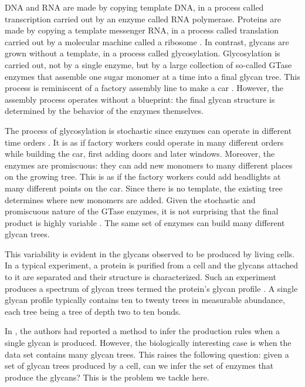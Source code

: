 
DNA and RNA are made by copying template DNA, in a process called transcription carried out by an enzyme called RNA polymerase. Proteins are made by copying a template messenger RNA, in a process called translation carried out by a molecular machine called a ribosome \cite{alberts2013essential}. In contrast, glycans are grown without a template, in a process called glycosylation. Glycosylation is carried out, not by a single enzyme, but by a large collection of so-called GTase enzymes that assemble one sugar monomer at a time into a final glycan tree. This process is reminiscent of a factory assembly line to make a car \cite{Jaiman2018}. However, the assembly process operates without a blueprint: the final glycan structure is determined by the behavior of the enzymes themselves.

The process of glycosylation is stochastic since enzymes can operate in different time orders \cite{Spahn2016}. It is as if factory workers could operate in many different orders while building the car, first adding doors and later windows. Moreover, the enzymes are promiscuous: they can add new monomers to many different places on the growing tree. This is as if the factory workers could add headlights at many different points on the car. Since there is no template, the existing tree determines where new monomers are added. Given the stochastic and promiscuous nature of the GTase enzymes, it is not surprising that the final product is highly variable \cite{Spahn2014}. The same set of enzymes can build many different glycan trees.

This variability is evident in the glycans observed to be produced by living cells. In a typical experiment, a protein is purified from a cell and the glycans attached to it are separated and their structure is characterized. Such an experiment produces a spectrum of glycan trees termed the protein's glycan profile \cite{Spahn2014}. A single glycan profile typically contains ten to twenty trees in measurable abundance, each tree being a tree of depth two to ten bonds. 

In \cite{Jaiman440792}, the authors had reported a method to infer the production rules when a single glycan is produced. However, the biologically interesting case is when the data set contains many glycan trees. This raises the following question: given a set of glycan trees produced by a cell,
can we infer the set of enzymes that produce the glycans? This is the problem we tackle here.

